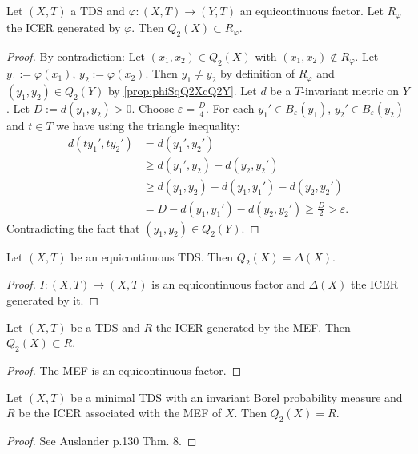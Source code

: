 \begin{theorem}
  Let $(X,T)$ a TDS and $\varphi : (X,T) \to (Y,T)$ an equicontinuous factor.
  Let $R_\varphi$ the ICER generated by $\varphi$. Then $Q_2(X) \subset R_\varphi$.
\end{theorem}
\begin{proof}
  By contradiction: Let $(x_1,x_2) \in Q_2(X)$ with $(x_1,x_2) \notin R_\varphi$.
  Let $y_1 := \varphi (x_1)$, $y_2 := \varphi (x_2)$.
  Then $y_1 \neq y_2$ by definition of $R_\varphi$ and $(y_1, y_2) \in Q_2 (Y)$ by \cref{prop:phiSqQ2XcQ2Y}.
  Let $d$ be a $T$-invariant metric on $Y$. Let $D := d(y_1, y_2) > 0$.
  Choose $\varepsilon = \frac{D}{4}$.
  For each $y_1' \in B_\varepsilon(y_1)$, $y_2' \in B_\varepsilon(y_2)$ and $t \in T$ we have using the triangle inequality:
  \begin{equation*}
    \begin{split}
      d(ty_1', ty_2') &= d(y_1', y_2') \\
      &\geq  d(y_1', y_2) - d(y_2, y_2')  \\
      &\geq d (y_1, y_2) - d(y_1, y_1')  - d(y_2, y_2')  \\
      &= D - d(y_1, y_1') - d(y_2, y_2') \geq \frac{D}{2} > \varepsilon.
    \end{split}
  \end{equation*}
  Contradicting the fact that $(y_1, y_2) \in Q_2(Y)$.
\end{proof}
\begin{corollary}
 Let $(X, T)$ be an equicontinuous TDS.
  Then $Q_2(X) = \Delta(X)$.
\end{corollary}
\begin{proof}
  $I : (X,T) \to (X,T)$ is an equicontinuous factor and $\Delta (X)$ the ICER generated by it.
  \end{proof}
\begin{corollary}
 Let $(X, T)$ be a TDS and $R$ the ICER generated by the MEF.
  Then $Q_2(X) \subset R$.
\end{corollary}
\begin{proof}
  The MEF is an equicontinuous factor.
  \end{proof}

\begin{theorem}
  Let $(X, T)$ be a minimal TDS with an invariant Borel probability measure
  and $R$ be the ICER associated with the MEF of $X$.
  Then $Q_2(X) = R$.
\end{theorem}

\begin{proof}
  See Auslander p.130 Thm. 8.
\end{proof}

